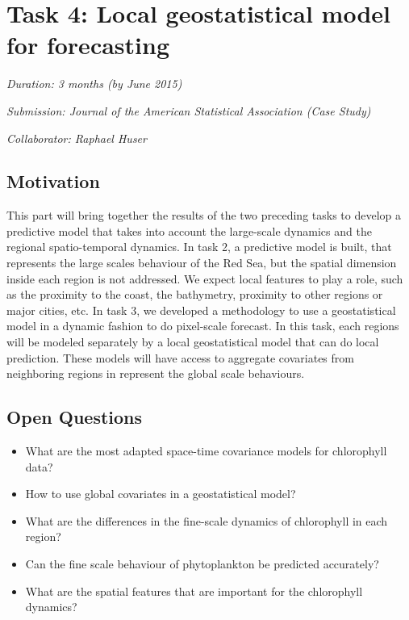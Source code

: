 \section{Task 4: Local geostatistical model for forecasting}

\noindent
\emph{Duration: 3 months (by June 2015)}

\noindent
\emph{Submission: Journal of the American Statistical Association (Case Study)}

\noindent
\emph{Collaborator: Raphael Huser}

\subsection{Motivation}

This part will bring together the results of the two preceding tasks to develop a predictive model that takes into account the large-scale dynamics and the regional spatio-temporal dynamics. In task 2, a predictive model is built, that represents the large scales behaviour of the Red Sea, but the spatial dimension inside each region is not addressed. We expect local features to play a role, such as the proximity to the coast, the bathymetry, proximity to other regions or major cities, etc. In task 3, we developed a methodology to use a geostatistical model in a dynamic fashion to do pixel-scale forecast. In this task, each regions will be modeled separately by a local geostatistical model that can do local prediction. These models will have access to aggregate covariates from neighboring regions in represent the global scale behaviours. 

\subsection{Open Questions}

\begin{itemize}
\item What are the most adapted space-time covariance models for chlorophyll data?
\item How to use global covariates in a geostatistical model?
\item What are the differences in the fine-scale dynamics of chlorophyll in each region?
\item Can the fine scale behaviour of phytoplankton be predicted accurately?
\item What are the spatial features that are important for the chlorophyll dynamics?
\end{itemize}

